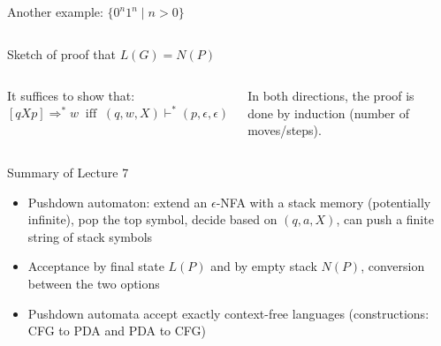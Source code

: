 \documentclass[handout]{beamer}
\begin{document}
\begin{frame}{Another example: $\{0^n1^n\mid n>0\}$}
\begin{columns}
        \begin{center}
        \end{center}

    \end{columns}

\end{frame}


\begin{frame}{Sketch of proof that $L(G)=N(P)$}

    \begin{columns}


        It suffices to show that:
        $$
        [qXp]\Rightarrow^*w\ \text{ iff }\ (q,w,X)\vdash^*(p,\epsilon,\epsilon)
        $$

        In both directions, the proof is done by induction (number of moves/steps).
        

        \begin{center}
                
        \end{center}

        \hfill\qedsymbol
                
    \end{columns}

\end{frame}


\begin{frame}{Summary of Lecture 7}
	
	\begin{itemize}        
		\item Pushdown automaton: extend an $\epsilon$-NFA with a stack memory (potentially infinite), pop the top symbol, decide based on $(q,a,X)$, can push a finite string of stack symbols
        \item Acceptance by final state $L(P)$ and by empty stack $N(P)$, conversion between the two options
        \item Pushdown automata accept exactly context-free languages (constructions: CFG to PDA and PDA to CFG)		
	\end{itemize}

\end{frame}
\end{document}
